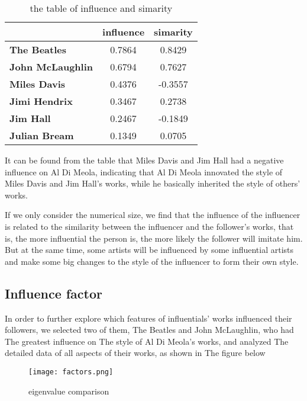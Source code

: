 \documentclass[12pt]{article}  %
\begin{document}
\begin{table}[H]
    \centering
    \begin{tabular}{lcc}
    \hline
    \hline
                                          & \textbf{influence} & \textbf{simarity}           \\ \hline
    \textbf{The Beatles}                  & 0.7864             & 0.8429                      \\
    \textbf{John McLaughlin}              & 0.6794             & 0.7627                      \\
    \textbf{Miles Davis}                  & 0.4376            & -0.3557 \\
    \textbf{Jimi Hendrix}                 & 0.3467            & 0.2738                      \\
    \textbf{Jim Hall}                     & 0.2467             & -0.1849 \\
    \textbf{Julian Bream}                 & 0.1349            & 0.0705                      \\ \hline
    \hline
    \end{tabular}
    \caption{the table of influence and simarity}
\end{table}
It can be found from the table that Miles Davis and Jim Hall had a negative influence on Al Di Meola, indicating that Al Di Meola innovated the style of Miles Davis and Jim Hall's works, while he basically inherited the style of others' works. 

If we only consider the numerical size, we find that the influence of the influencer is related to the similarity between the influencer and the follower's works, that is, the more influential the person is, the more likely the follower will imitate him. But at the same time, some artists will be influenced by some influential artists and make some big changes to the style of the influencer to form their own style.

\subsection{Influence factor}

In order to further explore which features of influentials' works influenced their followers, we selected two of them, The Beatles and John McLaughlin, who had The greatest influence on The style of Al Di Meola's works, and analyzed The detailed data of all aspects of their works, as shown in The figure below

\begin{figure}[H]
    \centering
    \texttt{[image: factors.png]}
    \caption{eigenvalue comparison}
    \label{img}
\end{figure}
\end{document}
